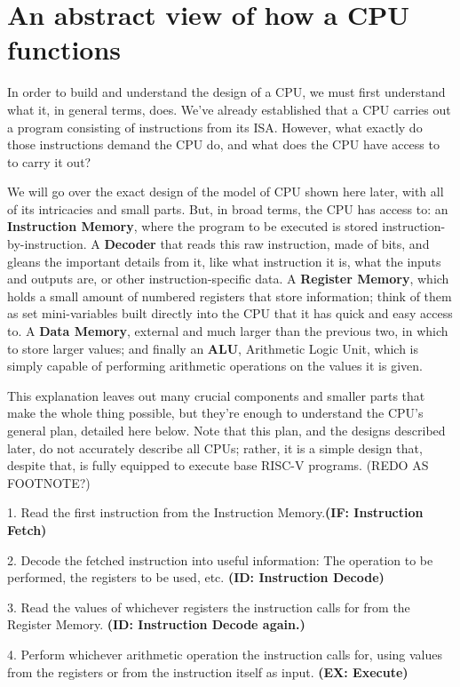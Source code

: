 \documentclass[12pt,twoside]{reedthesis}
\begin{document}
\section{An abstract view of how a CPU functions}
In order to build and understand the design of a CPU, we must first understand what it, in general terms, does. We've already established that a CPU carries out a program consisting of instructions from its ISA. However, what exactly do those instructions demand the CPU do, and what does the CPU have access to to carry it out?

We will go over the exact design of the model of CPU shown here later, with all of its intricacies and small parts. But, in broad terms, the CPU has access to: an \textbf{Instruction Memory}, where the program to be executed is stored instruction-by-instruction. A \textbf{Decoder} that reads this raw instruction, made of bits, and gleans the important details from it, like what instruction it is, what the inputs and outputs are, or other instruction-specific data. A \textbf{Register Memory}, which holds a small amount of numbered registers that store information; think of them as set mini-variables built directly into the CPU that it has quick and easy access to. A \textbf{Data Memory}, external and much larger than the previous two, in which to store larger values; and finally an \textbf{ALU}, Arithmetic Logic Unit, which is simply capable of performing arithmetic operations on the values it is given.

This explanation leaves out many crucial components and smaller parts that make the whole thing possible, but they're enough to understand the CPU's general plan, detailed here below. Note that this plan, and the designs described later, do not accurately describe all CPUs; rather, it is a simple design that, despite that, is fully equipped to execute base RISC-V programs. (REDO AS FOOTNOTE?)

1. Read the first instruction from the Instruction Memory.\textbf{(IF: Instruction Fetch)}

2. Decode the fetched instruction into useful information: The operation to be performed, the registers to be used, etc. \textbf{(ID: Instruction Decode)}

3. Read the values of whichever registers the instruction calls for from the Register Memory. \textbf{(ID: Instruction Decode again.)}

4. Perform whichever arithmetic operation the instruction calls for, using values from the registers or from the instruction itself as input. \textbf{(EX: Execute)}
\end{document}
